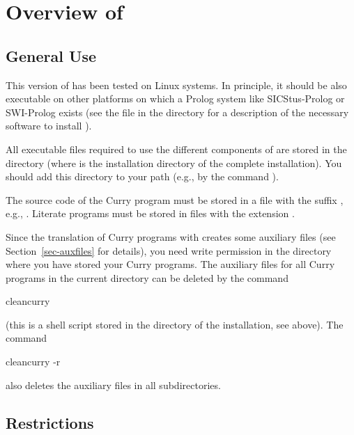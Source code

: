 \section{Overview of \CYS}

\subsection{General Use}
\label{sec-general}

This version of \CYS has been tested on Linux systems.
In principle, it should be also executable on other
platforms on which a Prolog system like SICStus-Prolog or SWI-Prolog exists
(see the file  in the \CYS directory
for a description of the necessary software to install \CYS).

All executable files required to use the different components
of \CYS are stored in the directory 
(where \cyshome is the installation directory of the complete
\CYS installation). You should add this directory
to your path (e.g., by the  command
).

The source code of the Curry program
must be stored in a file with the suffix ,
e.g., . 
Literate programs must be stored in files with the extension .

Since the translation of Curry programs with \CYS creates
some auxiliary files (see Section~\ref{sec-auxfiles} for details),
you need write permission
in the directory where you have stored your Curry programs.
The auxiliary files for all Curry programs in the current
directory can be deleted by the command
\begin{curry}
cleancurry
\end{curry}
(this is a shell script stored in the  directory of the
\CYS installation, see above).
The command
\begin{curry}
cleancurry -r
\end{curry}
also deletes the auxiliary files in all subdirectories.



\subsection{Restrictions}
\label{sec-restrictions}

